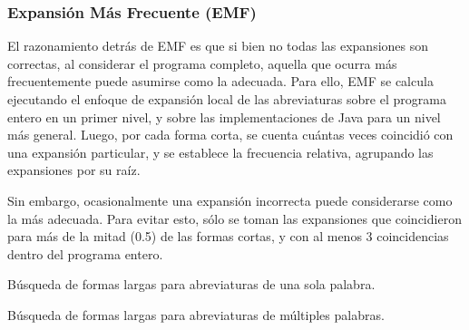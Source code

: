 {\subsubsection{Expansión Más Frecuente (EMF)}
El razonamiento detrás de EMF es que si bien no todas las expansiones son correctas, al considerar el programa completo, aquella que ocurra más frecuentemente puede asumirse como la adecuada.
Para ello, EMF se calcula ejecutando el enfoque de expansión local de las abreviaturas sobre el programa entero en un primer nivel, y sobre las implementaciones de Java para un nivel más general.
Luego, por cada forma corta, se cuenta cuántas veces coincidió con una expansión particular, y se establece la frecuencia relativa, agrupando las expansiones por su raíz.

Sin embargo, ocasionalmente una expansión incorrecta puede considerarse como la más adecuada.
Para evitar esto, sólo se toman las expansiones que coincidieron para más de la mitad (0.5) de las formas cortas, y con al menos 3 coincidencias dentro del programa entero.

\begin{algorithm}[H]
\caption{Búsqueda de formas largas para abreviaturas de una sola palabra.}
\label{algSingleWords}
\DontPrintSemicolon
  
  
  \BlankLine
\end{algorithm}

\begin{algorithm}
\caption{Búsqueda de formas largas para abreviaturas de múltiples palabras.}
\label{algMultiWords}
\DontPrintSemicolon
  

\end{algorithm}}
